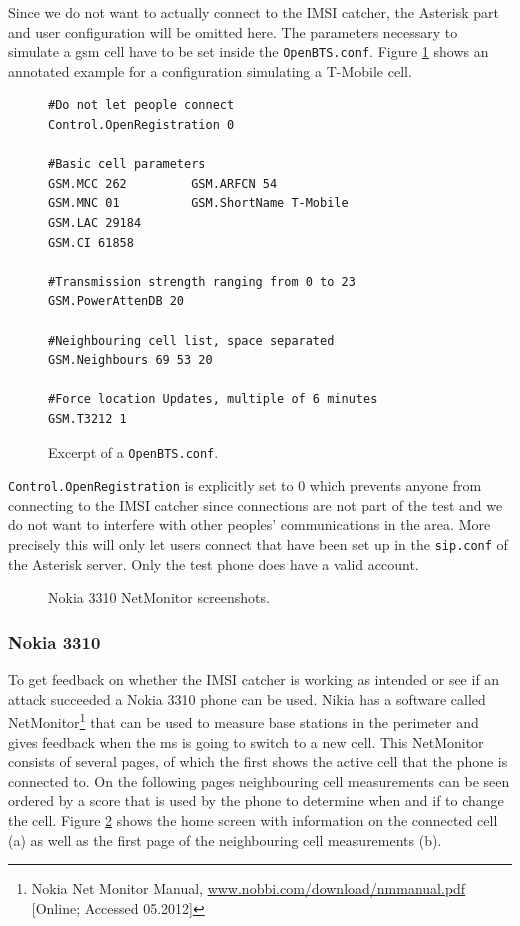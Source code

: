 Since we do not want to actually connect to the IMSI catcher, the Asterisk part and user configuration will be omitted here.
The parameters necessary to simulate a \gls{gsm} cell have to be set inside the \texttt{OpenBTS.conf}.
Figure \ref{fig:openbts_parameters} shows an annotated example for a configuration simulating a T-Mobile cell.
\begin{figure}
\hspace*{\dimexpr\fboxsep+\fboxrule}%
\begin{minipage}{\dimexpr\textwidth-4\fboxsep-2\fboxrule} 
\begin{lstlisting}
#Do not let people connect
Control.OpenRegistration 0

#Basic cell parameters
GSM.MCC 262			GSM.ARFCN 54
GSM.MNC 01			GSM.ShortName T-Mobile
GSM.LAC 29184		
GSM.CI 61858
	
#Transmission strength ranging from 0 to 23
GSM.PowerAttenDB 20

#Neighbouring cell list, space separated
GSM.Neighbours 69 53 20

#Force location Updates, multiple of 6 minutes
GSM.T3212 1
\end{lstlisting}
\end{minipage}
\caption{Excerpt of a \texttt{OpenBTS.conf}.}
\label{fig:openbts_parameters}
\end{figure}
\texttt{Control.OpenRegistration} is explicitly set to 0 which prevents anyone from connecting to the IMSI catcher since connections are not part of the test and we do not want to interfere with other peoples' communications in the area.
More precisely this will only let users connect that have been set up in the \texttt{sip.conf} of the Asterisk server.
Only the test phone does have a valid account.

\begin{figure}
\centering
{}
\caption{Nokia 3310 NetMonitor screenshots.}
\label{fig:netmonitor}
\end{figure}

\subsubsection{Nokia 3310}
To get feedback on whether the IMSI catcher is working as intended or see if an attack succeeded a Nokia 3310 phone can be used.
Nikia has a software called NetMonitor\footnote{Nokia Net Monitor Manual, \url{www.nobbi.com/download/nmmanual.pdf} [Online; Accessed 05.2012]} that can be used to measure base stations in the perimeter and gives feedback when the \gls{ms} is going to switch to a new cell.
This NetMonitor consists of several pages, of which the first shows the active cell that the phone is connected to.
On the following pages neighbouring cell measurements can be seen ordered by a score that is used by the phone to determine when and if to change the cell.
Figure \ref{fig:netmonitor} shows the home screen with information on the connected cell (a) as well as the first page of the neighbouring cell measurements (b).

